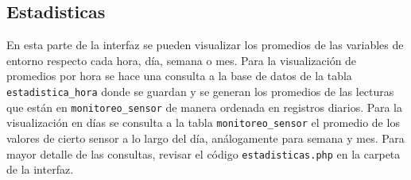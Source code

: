 \documentclass[10pt,twocolumn]{article}
\begin{document}
\subsection{Estadisticas}
En esta parte de la interfaz se pueden visualizar los promedios de las variables de entorno respecto cada hora, d\'ia, semana o mes. Para la visualizaci\'on de promedios 
por hora se hace una consulta a la base de datos de la tabla \verb|estadistica_hora| donde se guardan y se generan los promedios de las lecturas que est\'an en 
\verb|monitoreo_sensor| de manera ordenada en registros diarios. Para la visualizaci\'on en d\'ias se consulta a la tabla \verb|monitoreo_sensor| el promedio de los 
valores de cierto sensor a lo largo del d\'ia, an\'alogamente para semana y mes. Para mayor detalle de las consultas, revisar el c\'odigo \verb|estadisticas.php| 
en 
la carpeta de la interfaz.
\end{document}
